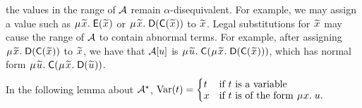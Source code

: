 \begin{examplex}
the values in the range of $\mathcal{A}$ remain $\alpha$-disequivalent.
For example, we may assign a value such as
$\MU {\Varec{x}}.\; \const{E}( {\Varec{x}} )$ or
$\MU {\Varec{x}}.\; \const{D}( \const{C}( {\Varec{x}} ) )$
to ${\Varec{x}}$.
Legal substitutions for ${\Varec{x}}$ may cause the range of $\mathcal{A}$ to contain abnormal terms.
For example, after assigning $\MU {\Varec{x}}.\; \const{D}( \const{C}( {\Varec{x}} ) )$ to $\Varec{x}$, we have that
$\mathcal{A} [u]$ is $\MU {\Varec{u}}.\; \const{C}( \MU {\Varec{x}}.\; \const{D}( \const{C}( {\Varec{x}} ) ) )$,
which has normal form
$\MU {\Varec{u}}.\; \const{C}( \MU {\Varec{x}}.\; \const{D}( {\Varec{u}} ) )$.
\xend
\end{examplex}

In the following lemma about $\mathcal{A}^\star$,
$\vphantom{\Bigl(_j}\muvar( t ) = \smash{\begin{cases}
  t & \text{if $t$ is a variable} \\[-\jot]
  x & \text{if $t$ is of the form $\MU {x}.\; u$.} 
\end{cases}}$

%

